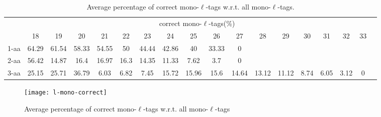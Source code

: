 \documentclass{article}[12pt]
\begin{document}
\begin{landscape}
\begin{table}[h]
\vspace{3mm}
\end{table}
\begin{table}[h]\tiny
\vspace{3mm}
{\centering
\begin{center}
\begin{tabular}{|l|c|c|c|c|c|c|c|c|c|c|c|c|c|c|c|c|c|}
  \hline
  & \multicolumn{ 16 }{|c|}{correct mono-$\ell$-tags(\%)} \\
  \cline{2- 17}
    & 18 & 19 & 20 & 21 & 22 & 23 & 24 & 25 & 26 & 27 & 28 & 29 & 30 & 31 & 32 & 33\\
  \hline
1-aa  & 64.29 & 61.54 & 58.33 & 54.55 & 50 & 44.44 & 42.86 & 40 & 33.33 & 0 &  &  &  &  &  & \\
2-aa  & 56.42 & 14.87 & 16.4 & 16.97 & 16.3 & 14.35 & 11.33 & 7.62 & 3.7 & 0 &  &  &  &  &  & \\
3-aa  & 25.15 & 25.71 & 36.79 & 6.03 & 6.82 & 7.45 & 15.72 & 15.96 & 15.6 & 14.64 & 13.12 & 11.12 & 8.74 & 6.05 & 3.12 & 0\\
 \hline
\end{tabular}
\end{center}
\par}
\centering

\caption{ Average percentage of correct mono-$\ell$-tags w.r.t. all mono-$\ell$-tags.}
\label{table:l-mono-correct}

\vspace{3mm}
\end{table}
\end{landscape}

\begin{figure}
  \begin{center}
\texttt{[image: l-mono-correct]}
\end{center}
\caption{Average percentage of correct mono-$\ell$-tags w.r.t. all mono-$\ell$-tags}
  \label{fig:l-mono-correct}
\end{figure}


\end{document}

